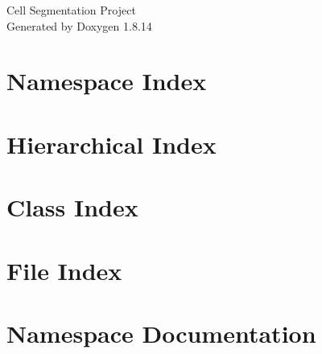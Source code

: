 \documentclass[twoside]{book}
\newcommand{\+}{\discretionary{\mbox{\scriptsize$\hookleftarrow$}}{}{}}
\newcommand{\clearemptydoublepage}{%
  \newpage{\pagestyle{empty}\cleardoublepage}%
}
\begin{document}
\hypersetup{pageanchor=false,
             bookmarksnumbered=true,
             pdfencoding=unicode
            }
\begin{titlepage}
\vspace*{7cm}
\begin{center}%
{\Large Cell Segmentation Project }\\
\vspace*{1cm}
{\large Generated by Doxygen 1.8.14}\\
\end{center}
\end{titlepage}
\clearemptydoublepage
{}
\tableofcontents
\clearemptydoublepage
{}
\hypersetup{pageanchor=true}

\chapter{Namespace Index}

\chapter{Hierarchical Index}

\chapter{Class Index}

\chapter{File Index}

\chapter{Namespace Documentation}



















\end{document}

